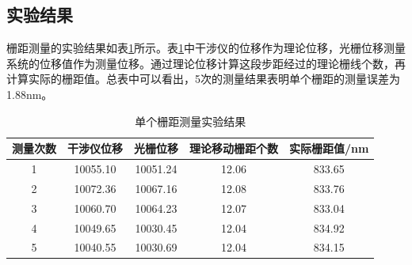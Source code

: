 \documentclass[type=master,oneside]{fduthesis}
\begin{document}
\subsection{实验结果}
栅距测量的实验结果如表\ref{table：单个栅距测量实验结果}所示。表\ref{table：单个栅距测量实验结果}中干涉仪的位移作为理论位移，光栅位移测量系统的位移值作为测量位移。通过理论位移计算这段步距经过的理论栅线个数，再计算实际的栅距值。总表中可以看出，5次的测量结果表明单个栅距的测量误差为1.88nm。
\begin{table}[H]
  \centering
  \caption{单个栅距测量实验结果}
  \label{table：单个栅距测量实验结果}
  \begin{tabular}{c|c|c|c|c}
    \hline
    测量次数 & 干涉仪位移 & 光栅位移 & 理论移动栅距个数 & 实际栅距值/nm \\ \hline
    1        & 10055.10   & 10051.24 & 12.06            & 833.65        \\ \hline
    2        & 10072.36   & 10067.16 & 12.08            & 833.76        \\ \hline
    3        & 10060.70   & 10064.23 & 12.07            & 833.04        \\ \hline
    4        & 10049.65   & 10030.45 & 12.04            & 834.92        \\ \hline
    5        & 10040.55   & 10030.69 & 12.04            & 834.15        \\ \hline
  \end{tabular}
\end{table}
\end{document}
